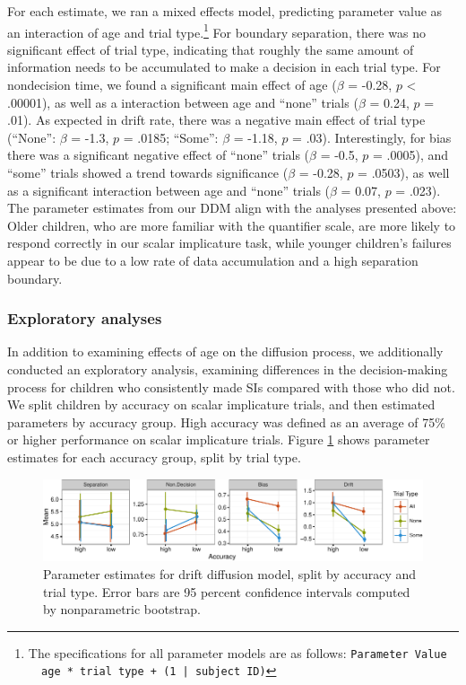 \documentclass[10pt, letterpaper]{article}
\newenvironment{CodeChunk}{}{}
\begin{document}
For each estimate, we ran a mixed effects model, predicting parameter
value as an interaction of age and trial
type.\footnote{The specifications for all parameter models are as follows: \texttt{Parameter Value ~ age * trial type + (1 | subject ID)}}
For boundary separation, there was no significant effect of trial type,
indicating that roughly the same amount of information needs to be
accumulated to make a decision in each trial type. For nondecision time,
we found a significant main effect of age (\(\beta\) = -0.28, \(p\)
\textless{} .00001), as well as a interaction between age and ``none''
trials (\(\beta\) = 0.24, \(p\) = .01). As expected in drift rate, there
was a negative main effect of trial type (``None'': \(\beta\) = -1.3,
\(p\) = .0185; ``Some'': \(\beta\) = -1.18, \(p\) = .03). Interestingly,
for bias there was a significant negative effect of ``none'' trials
(\(\beta\) = -0.5, \(p\) = .0005), and ``some'' trials showed a trend
towards significance (\(\beta\) = -0.28, \(p\) = .0503), as well as a
significant interaction between age and ``none'' trials (\(\beta\) =
0.07, \(p\) = .023). The parameter estimates from our DDM align with the
analyses presented above: Older children, who are more familiar with the
quantifier scale, are more likely to respond correctly in our scalar
implicature task, while younger children's failures appear to be due to
a low rate of data accumulation and a high separation boundary.

\subsubsection{Exploratory analyses}\label{exploratory-analyses}

In addition to examining effects of age on the diffusion process, we
additionally conducted an exploratory analysis, examining differences in
the decision-making process for children who consistently made SIs
compared with those who did not. We split children by accuracy on scalar
implicature trials, and then estimated parameters by accuracy group.
High accuracy was defined as an average of 75\% or higher performance on
scalar implicature trials. Figure \ref{fig:param_plot} shows parameter
estimates for each accuracy group, split by trial type.

\begin{CodeChunk}
\begin{figure}[t]

{\centering \includegraphics{figs/param_plot-1} 

}

\caption[Parameter estimates for drift diffusion model, split by accuracy and trial type]{Parameter estimates for drift diffusion model, split by accuracy and trial type. Error bars are 95 percent confidence intervals computed by nonparametric bootstrap.}\label{fig:param_plot}
\end{figure}
\end{CodeChunk}
\end{document}
